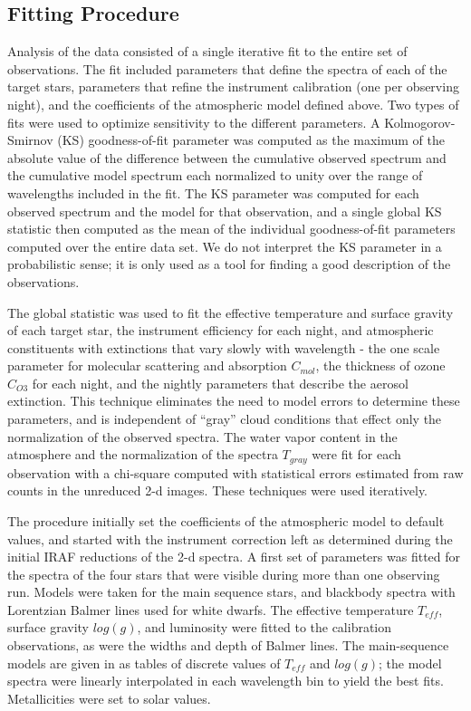 \documentclass[manuscript]{aastex}
\begin{document}
\subsection{Fitting Procedure}

Analysis of the data consisted of a single iterative fit to the entire set of observations.
The fit included parameters that define the spectra of each of the target stars,
parameters that refine the instrument calibration (one per observing night), and the coefficients of the atmospheric model defined above.
Two types of fits were used to optimize sensitivity to the different parameters.
A Kolmogorov-Smirnov (KS) goodness-of-fit parameter was computed as the maximum of the absolute value of the difference between the cumulative
observed spectrum and the cumulative model spectrum each normalized to unity over the range of wavelengths included in the fit.
The KS parameter was computed for each observed spectrum and the model for that observation,
and a single global KS statistic then computed as the mean of the individual goodness-of-fit parameters computed over the entire data set.
We do not interpret the KS parameter in a probabilistic sense; it is only used as a tool for finding a good description of the observations.

The global statistic was used to fit the effective temperature and surface gravity of each target star, the instrument efficiency for each night,
and atmospheric constituents with extinctions that vary slowly with wavelength -
the one scale parameter for molecular scattering and absorption $C_{mol}$, the thickness of ozone $C_{O3}$ for each night,
and the nightly parameters that describe the aerosol extinction.
This technique eliminates the need to model errors to determine these parameters,
and is independent of ``gray'' cloud conditions that effect only the normalization of the observed spectra.
The water vapor content in the atmosphere and the normalization of the spectra $T_{gray}$ were fit for each observation with a chi-square
computed with statistical errors estimated from raw counts in the unreduced 2-d images.
These techniques were used iteratively.
  
The procedure initially set the coefficients of the atmospheric model to default values,
and started with the instrument correction left as determined during the initial IRAF reductions of the 2-d spectra.
A first set of parameters was fitted for the spectra of the four stars that were visible during more than one observing run.
Models \cite{kurucz93} were taken for the main sequence stars, and blackbody spectra with Lorentzian Balmer lines used for white dwarfs.
The effective temperature $T_{eff}$, surface gravity $log(g)$, and luminosity were fitted to the calibration observations, 
as were the widths and depth of Balmer lines.
The main-sequence models are given in \cite{kurucz93} as tables of discrete values of $T_{eff}$ and $log(g)$; the model spectra
were linearly interpolated in each wavelength bin to yield the best fits.   Metallicities were set to solar values.
\end{document}
